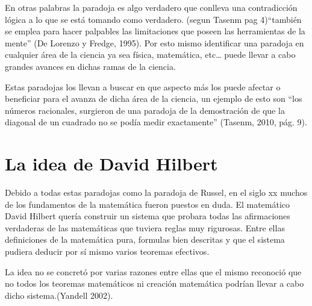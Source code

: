 \documentclass{article}
\begin{document}
\vspace{10pt}
 En otras palabras la paradoja es algo verdadero que conlleva una contradicción lógica a lo que se está tomando como verdadero. (segun Tasenm pag 4)“también se emplea para hacer palpables las limitaciones que poseen las herramientas de la mente” (De Lorenzo y Fredge, 1995). Por esto mismo identificar una paradoja en cualquier área de la ciencia ya sea física, matemática, etc… puede llevar a cabo grandes avances en dichas ramas de la ciencia.

\vspace{10pt}

Estas paradojas los llevan a buscar en que aspecto más los puede afectar o beneficiar para el avanza de dicha área de la ciencia, un ejemplo de esto son “los números racionales, surgieron de una paradoja de la demostración de  que la diagonal de un cuadrado no se podía medir exactamente” (Tasenm, 2010, pág. 9).
\vspace{10pt}

\section{La idea de David Hilbert}
Debido a todas estas paradojas como la paradoja de Russel, en el siglo xx muchos de los fundamentos de la matemática fueron puestos en duda. El matemático David Hilbert quería construir un sistema que probara todas las afirmaciones verdaderas  de las matemáticas que tuviera reglas muy rigurosas. Entre ellas definiciones de la matemática pura, formulas bien descritas y que el sistema pudiera deducir por sí mismo varios teoremas efectivos.

\vspace{10pt}

La idea no se concretó por varias razones entre ellas que el mismo reconoció que no todos los teoremas matemáticos ni creación matemática podrían llevar a cabo dicho sistema.(Yandell 2002).

\vspace{10pt}
\end{document}
